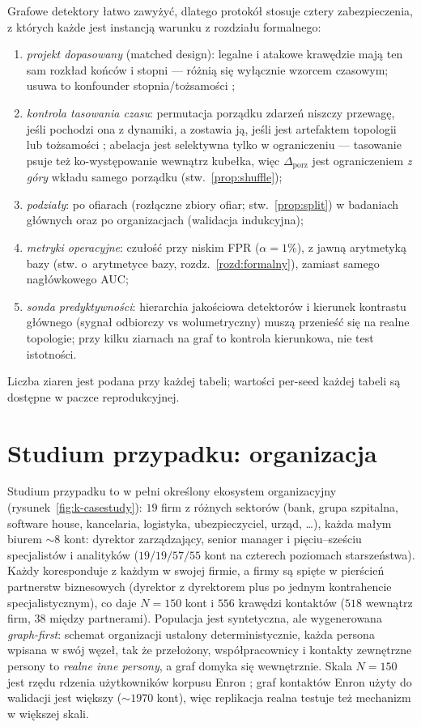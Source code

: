 Grafowe detektory łatwo zawyżyć, dlatego protokół stosuje cztery
zabezpieczenia, z których każde jest instancją warunku z rozdziału
formalnego:
\begin{enumerate}
\item \emph{projekt dopasowany} (matched design): legalne i atakowe
krawędzie mają ten sam rozkład końców i stopni --- różnią się wyłącznie
wzorcem czasowym; usuwa to konfounder stopnia/tożsamości
\citep{arp2022dos};
\item \emph{kontrola tasowania czasu}: permutacja porządku zdarzeń
niszczy przewagę, jeśli pochodzi ona z dynamiki, a zostawia ją, jeśli
jest artefaktem topologii lub tożsamości \citep{pendlebury2019tesseract};
abelacja jest selektywna tylko w ograniczeniu --- tasowanie psuje też
ko-występowanie wewnątrz kubełka, więc $\Delta_{\mathrm{porz}}$ jest
ograniczeniem \emph{z góry} wkładu samego porządku
(stw.~\ref{prop:shuffle});
\item \emph{podziały}: po ofiarach (rozłączne zbiory ofiar;
stw.~\ref{prop:split}) w badaniach głównych oraz po organizacjach
(walidacja indukcyjna);
\item \emph{metryki operacyjne}: czułość przy niskim FPR
($\alpha=1\%$), z jawną arytmetyką bazy (stw. o~arytmetyce bazy,
rozdz.~\ref{rozd:formalny}), zamiast samego nagłówkowego AUC;
\item \emph{sonda predyktywności}: hierarchia jakościowa detektorów
i kierunek kontrastu głównego (sygnał odbiorczy vs wolumetryczny)
muszą przenieść się na realne topologie; przy kilku ziarnach na graf
to kontrola kierunkowa, nie test istotności.
\end{enumerate}
Liczba ziaren jest podana przy każdej tabeli; wartości per-seed
każdej tabeli są dostępne w paczce reprodukcyjnej.

\section{Studium przypadku: organizacja}
\label{sec:k-studium}

Studium przypadku to w pełni określony ekosystem organizacyjny
(rysunek~\ref{fig:k-casestudy}): $19$ firm z różnych sektorów (bank,
grupa szpitalna, software house, kancelaria, logistyka, ubezpieczyciel,
urząd, \dots), każda małym biurem $\sim\!8$ kont: dyrektor zarządzający,
senior manager i pięciu--sześciu specjalistów i analityków
($19/19/57/55$ kont na czterech poziomach starszeństwa). Każdy
koresponduje z każdym w swojej firmie, a firmy są spięte w pierścień
partnerstw biznesowych (dyrektor z dyrektorem plus po jednym
kontrahencie specjalistycznym), co daje $N{=}150$ kont i $556$
krawędzi kontaktów ($518$ wewnątrz firm, $38$ między partnerami).
Populacja jest syntetyczna, ale wygenerowana \emph{graph-first}:
schemat organizacji ustalony deterministycznie, każda persona wpisana
w swój węzeł, tak że przełożony, współpracownicy i kontakty zewnętrzne
persony to \emph{realne inne persony}, a graf domyka się wewnętrznie.
Skala $N{=}150$ jest rzędu rdzenia użytkowników korpusu Enron
\citep{klimt2004enron}; graf kontaktów Enron użyty do walidacji jest
większy ($\sim\!1970$ kont), więc replikacja realna testuje też
mechanizm w większej skali.

